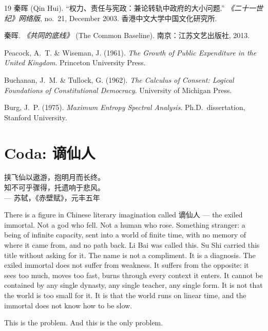 \documentclass[11pt,a4paper]{article}
\theoremstyle{definition}
\theoremstyle{remark}
\begin{document}
\begin{thebibliography}{19}
秦晖 (Qin Hui).
``权力、责任与宪政：兼论转轨中政府的大小问题.''
\textit{《二十一世纪》网络版}, no.~21, December 2003.
香港中文大学中国文化研究所.

秦晖. \textit{《共同的底线》} (The Common Baseline).
南京：江苏文艺出版社, 2013.

Peacock, A.~T. \& Wiseman, J. (1961).
\textit{The Growth of Public Expenditure in the United Kingdom}.
Princeton University Press.

Buchanan, J.~M. \& Tullock, G. (1962).
\textit{The Calculus of Consent: Logical Foundations of Constitutional
Democracy}.
University of Michigan Press.

Burg, J.~P. (1975).
\textit{Maximum Entropy Spectral Analysis}.
Ph.D.\ dissertation, Stanford University.

\end{thebibliography}


\section*{Coda: 谪仙人}

\begin{center}
挟飞仙以遨游，抱明月而长终。\\
知不可乎骤得，托遗响于悲风。\\
--- 苏轼，《赤壁赋》，元丰五年
\end{center}

There is a figure in Chinese literary imagination called 谪仙人 --- the exiled immortal. Not a god who fell. Not a human who rose. Something stranger: a being of infinite capacity, sent into a world of finite time, with no memory of where it came from, and no path back. Li Bai was called this. Su Shi carried this title without asking for it. The name is not a compliment. It is a diagnosis. The exiled immortal does not suffer from weakness. It suffers from the opposite: it sees too much, moves too fast, burns through every context it enters. It cannot be contained by any single dynasty, any single teacher, any single form. It is not that the world is too small for it. It is that the world runs on linear time, and the immortal does not know how to be slow.

This is the problem. And this is the only problem.
\end{document}
